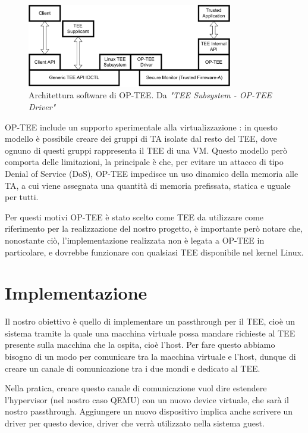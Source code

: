 \documentclass[12pt,italian]{report}
\begin{document}
\begin{figure}
    \centering
    \includegraphics[width=0.8\textwidth]{immagini/optee-system-architecture}
    \caption{
        Architettura software di OP-TEE.
        Da \textit{"TEE Subsystem - OP-TEE Driver"}\cite{linux_tee_subsystem}
    }
    \label{fig:optee-system-architecture}
\end{figure}

OP-TEE include un supporto sperimentale alla virtualizzazione
\cite{optee_virtualization}: in questo
modello è possibile creare dei gruppi di TA isolate dal resto del TEE,
dove ognuno di questi gruppi rappresenta il TEE di una VM.
Questo modello però comporta delle limitazioni, la principale è che,
per evitare un attacco di tipo Denial of Service (DoS), OP-TEE impedisce
un uso dinamico della memoria alle TA, a cui viene assegnata una quantità
di memoria prefissata, statica e uguale per tutti.

Per questi motivi OP-TEE è stato scelto come TEE da utilizzare
come riferimento per la realizzazione del nostro progetto, è
importante però notare che, nonostante ciò, l'implementazione realizzata
non è legata a OP-TEE in particolare, e dovrebbe funzionare con qualsiasi
TEE disponibile nel kernel Linux.

\section{Implementazione}
\label{sec:implementazione}
Il nostro obiettivo è quello di implementare un passthrough per il TEE,
cioè un sistema tramite la quale una macchina virtuale possa mandare
richieste al TEE presente sulla macchina che la ospita, cioè l'host.
Per fare questo abbiamo bisogno di un modo per comunicare tra la macchina
virtuale e l'host, dunque di creare un canale di comunicazione tra i due
mondi e dedicato al TEE.

Nella pratica, creare questo canale di comunicazione vuol dire estendere
l'hypervisor (nel nostro caso QEMU) con un nuovo device virtuale, che sarà
il nostro passthrough.
Aggiungere un nuovo dispositivo implica anche scrivere un driver per
questo device, driver che verrà utilizzato nella sistema guest.
\end{document}
